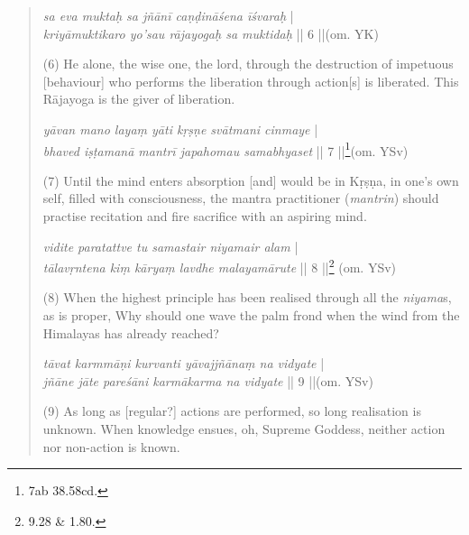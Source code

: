 \begin{quote}
\textit{sa eva muktaḥ sa jñānī caṇḍināśena īśvaraḥ} |\\
\textit{kriyāmuktikaro yo'sau rājayogaḥ sa muktidaḥ} || 6 ||(om. YK)

(6) He alone, the wise one, the lord, through the destruction of impetuous [behaviour]
who performs the liberation through action[s] is liberated. This Rājayoga is the giver of liberation.

\textit{yāvan mano layaṃ yāti kṛṣṇe svātmani cinmaye} | \\ 
\textit{bhaved iṣṭamanā mantrī japahomau samabhyaset} || 7 ||\footnote{7ab \approx {} 38.58cd.}(om. YSv) 

(7) Until the mind enters absorption [and] would be in Kṛṣṇa, in one's own self, filled with consciousness,
the mantra practitioner (\textit{mantrin}) should practise recitation and fire sacrifice with an aspiring mind. 

\textit{vidite paratattve tu samastair niyamair alam} |\\
\textit{tālavṛntena kiṃ kāryaṃ lavdhe malayamārute} || 8 ||\footnote{\approx {} 9.28 \&  1.80.} (om. YSv) 

(8) When the highest principle has been realised through all the \textit {niyama}s, as is proper,
Why should one wave the palm frond when the wind from the Himalayas has already reached?

\textit{tāvat karmmāṇi kurvanti yāvajjñānaṃ na vidyate} |\\ 
\textit{jñāne jāte pareśāni karmākarma na vidyate} || 9 ||(om. YSv) 

(9) As long as [regular?] actions are performed, so long realisation is unknown.
When knowledge ensues, oh, Supreme Goddess, neither action nor non-action is known.
\end{quote}

